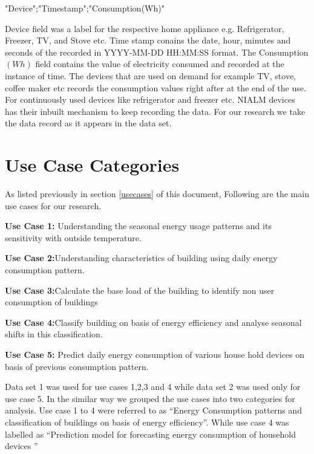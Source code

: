 "Device";"Timestamp";"Consumption(Wh)"

Device field was a label for the respective home appliance e.g. Refrigerator, Freezer, TV, and Stove etc. Time stamp conains the date, hour, minutes and seconds of the recorded in  YYYY-MM-DD HH:MM:SS format. The Consumption\((Wh)\) field contains the value of electricity consumed and recorded at the instance of time. The devices that are used on demand for example TV, stove, coffee maker etc records the consumption values right after at the end of the use. For continuously used devices like refrigerator and freezer etc. NIALM devices has their inbuilt mechanism to keep recording the data. For our research we take the data record as it appears in the data set.   

\section{Use Case Categories}

As listed previously in section \ref{usecases} of this document, Following are the main use cases for our research.

\textbf{Use Case 1:} Understanding the seasonal energy usage patterns and its sensitivity with outside temperature.

\textbf{Use Case 2:}Understanding characteristics of building using daily energy consumption pattern.

\textbf{Use Case 3:}Calculate the base load of the building to identify non user consumption of buildings

\textbf{Use Case 4:}Classify building on basis of energy efficiency and analyse seasonal shifts in this classification.

\textbf{Use Case 5:} Predict daily energy consumption of various house hold devices on basis of previous consumption pattern.

Data set 1 was used for use cases 1,2,3 and 4 while data set 2 was used only for use case 5. In the similar way we grouped the use cases into two categories for analysis. Use case 1 to 4 were referred to as ``Energy Consumption patterns and classification of buildings on basis of energy efficiency''. While use case 4 was labelled as ``Prediction model for forecasting energy consumption of household devices ''


